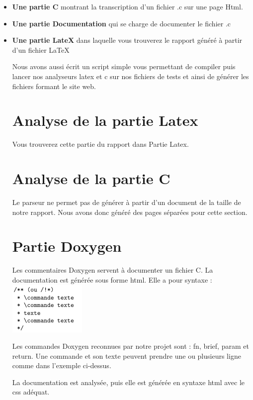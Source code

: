 \documentclass[10pt,a4paper]{report}
\begin{document}
\begin{itemize}
\item {\bf Une partie C} montrant la transcription d'un fichier .c sur une page Html.
\item {\bf Une partie Documentation} qui se charge de documenter le fichier .c
\item {\bf Une partie LateX} dans laquelle vous trouverez le rapport généré à partir d'un fichier LaTeX

Nous avons aussi écrit un script simple vous permettant de compiler puis lancer nos analyseurs latex et c sur nos fichiers de tests et ainsi de générer les fichiers formant le site web. \\

\section{Analyse de la partie Latex}

Vous trouverez cette partie du rapport dans Partie Latex.

\section{Analyse de la partie C}

Le parseur ne permet pas de générer à partir d'un document de la taille de notre rapport. Nous avons donc généré des pages séparées pour cette section.

\section{Partie Doxygen}

Les commentaires Doxygen servent à documenter un fichier C. La documentation est générée sous forme html. Elle a pour syntaxe :
\newline
\includegraphics{code1.png}

Les commandes Doxygen reconnues par notre projet sont : fn, brief, param et return. Une commande et son texte peuvent prendre une ou plusieurs ligne comme dans l'exemple ci-dessus.

La documentation est analysée, puis elle est générée en syntaxe html avec le css adéquat.


\end{itemize}
\end{document}
